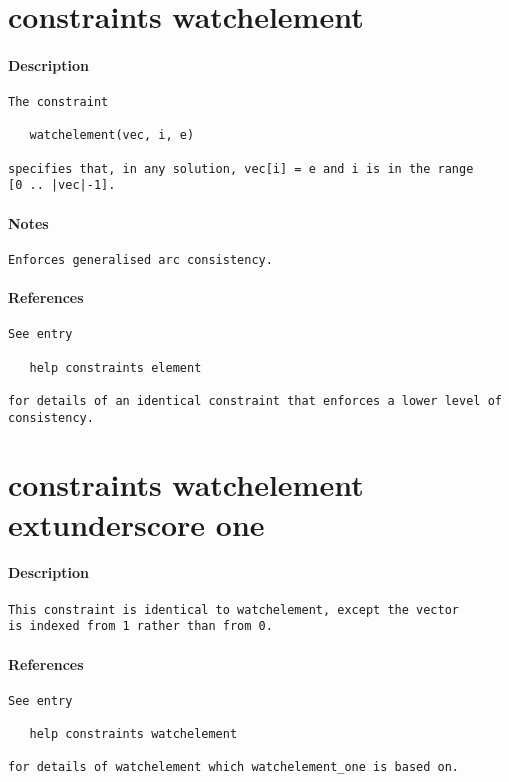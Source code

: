 \section{constraints watchelement}
\paragraph{Description}
{\footnotesize
\begin{verbatim}
The constraint 

   watchelement(vec, i, e)

specifies that, in any solution, vec[i] = e and i is in the range 
[0 .. |vec|-1].
\end{verbatim}
}
\paragraph{Notes}
{\footnotesize
\begin{verbatim}
Enforces generalised arc consistency.
\end{verbatim}
}
\paragraph{References}
{\footnotesize
\begin{verbatim}
See entry

   help constraints element

for details of an identical constraint that enforces a lower level of
consistency.
\end{verbatim}
}
\section{constraints watchelement	extunderscore one}
\paragraph{Description}
{\footnotesize
\begin{verbatim}
This constraint is identical to watchelement, except the vector
is indexed from 1 rather than from 0.
\end{verbatim}
}
\paragraph{References}
{\footnotesize
\begin{verbatim}
See entry

   help constraints watchelement

for details of watchelement which watchelement_one is based on.
\end{verbatim}
}
